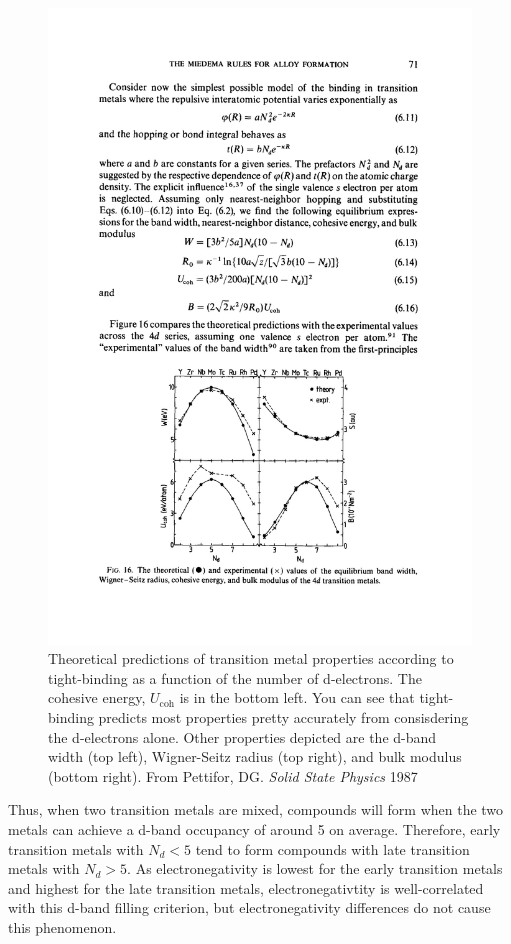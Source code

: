 \documentclass[12pt]{article}
\begin{document}
\begin{figure}[h]
\centering
\includegraphics[width=13cm]{cohesion_in_TMs_pettifor_1987}
\caption{Theoretical predictions of transition metal properties according to tight-binding as a function of the number of d-electrons. The cohesive energy, $U_{\text{coh}}$ is in the bottom left. You can see that tight-binding predicts most properties pretty accurately from consisdering the d-electrons alone. Other properties depicted are the d-band width (top left), Wigner-Seitz radius (top right), and bulk modulus (bottom right). From Pettifor, DG. \textit{Solid State Physics} 1987}
\label{cohesion_in_TMs}
\end{figure}

Thus, when two transition metals are mixed, compounds will form when the two metals can achieve a d-band occupancy of around 5 on average. Therefore, early transition metals with $N_d<5$ tend to form compounds with late transition metals with $N_d>5$. As electronegativity is lowest for the early transition metals and highest for the late transition metals, electronegativtity is well-correlated with this d-band filling criterion, but electronegativity differences do not cause this phenomenon.
\end{document}

